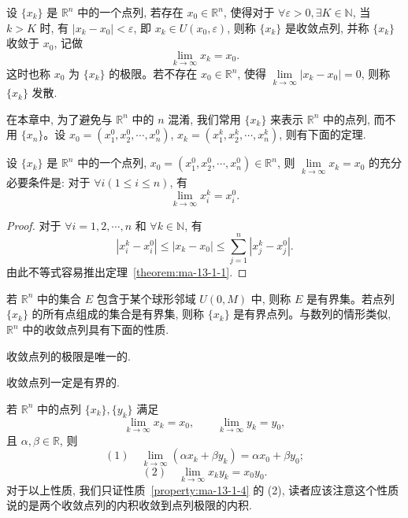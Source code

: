 \begin{definition}\label{definition:ma-13-1-3}
设 $\{x_k\}$ 是 $\mathbb R^n$ 中的一个点列, 若存在 $x_0\in\mathbb R^n$, 使得对于 $\forall\varepsilon>0,\exists K\in\mathbb N$, 当 $k>K$ 时, 有 $|x_k-x_0|<\varepsilon$, 即 $x_k\in U(x_0,\varepsilon)$, 则称 $\{x_k\}$ 是收敛点列, 并称 $\{x_k\}$ 收敛于 $x_0$, 记做
\[
  \lim_{k\to\infty}x_k=x_0.
\]
这时也称 $x_0$ 为 $\{x_k\}$ 的极限。若不存在 $x_0\in\mathbb R^n$, 使得 $\lim\limits_{k\to\infty}|x_k-x_0|=0$, 则称 $\{x_k\}$ 发散.
\end{definition}

在本章中, 为了避免与 $\mathbb R^n$ 中的 $n$ 混淆, 我们常用 $\{x_k\}$ 来表示 $\mathbb R^n$ 中的点列, 而不用 $\{x_n\}$。设 $x_0=(x_1^0,x_2^0,\cdots,x_n^0)$, $x_k=(x_1^k,x_2^k,\cdots,x_n^k)$, 则有下面的定理.

\begin{theorem}\label{theorem:ma-13-1-1}
设 $\{x_k\}$ 是 $\mathbb R^n$ 中的一个点列, $x_0=(x_1^0,x_2^0,\cdots,x_n^0)\in\mathbb R^n$, 则 $\lim\limits_{k\to\infty}x_k=x_0$ 的充分必要条件是: 对于 $\forall i(1\leqslant i\leqslant n)$, 有
\[
  \lim_{k\to\infty}x_i^k=x_i^0.
\]
\end{theorem}


\begin{proof}
对于 $\forall i=1,2,\cdots,n$ 和 $\forall k\in\mathbb N$, 有
\[
  |x_i^k-x_i^0|\leqslant |x_k-x_0|\leqslant \sum_{j=1}^n|x_j^k-x_j^0|.
\]
由此不等式容易推出定理~\ref{theorem:ma-13-1-1}.
\end{proof}


若 $\mathbb R^n$ 中的集合 $E$ 包含于某个球形邻域 $U(0,M)$ 中, 则称 $E$ 是有界集。若点列 $\{x_k\}$ 的所有点组成的集合是有界集, 则称 $\{x_k\}$ 是有界点列。与数列的情形类似, $\mathbb R^n$ 中的收敛点列具有下面的性质.

\begin{property}\label{property:ma-13-1-2}
收敛点列的极限是唯一的.
\end{property}


\begin{property}\label{property:ma-13-1-3}
收敛点列一定是有界的.
\end{property}


\begin{property}\label{property:ma-13-1-4}
若 $\mathbb R^n$ 中的点列 $\{x_k\},\{y_k\}$ 满足
\[
  \lim_{k\to\infty}x_k=x_0,\qquad \lim_{k\to\infty}y_k=y_0,
\]
且 $\alpha,\beta\in\mathbb R$, 则
\[
  (1)\quad \lim_{k\to\infty}(\alpha x_k+\beta y_k)=\alpha x_0+\beta y_0;
\]
\[
  (2)\quad \lim_{k\to\infty}x_ky_k=x_0y_0.
\]
对于以上性质, 我们只证性质~\ref{property:ma-13-1-4} 的 (2), 读者应该注意这个性质说的是两个收敛点列的内积收敛到点列极限的内积.
\end{property}


